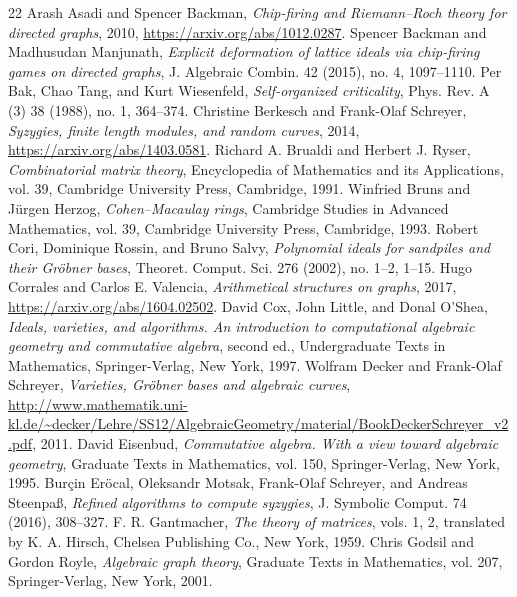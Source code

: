 \begin{thebibliography}{22}
 Arash Asadi and Spencer Backman, \emph{Chip-firing and Riemann--Roch theory for directed graphs}, 2010, \url{https://arxiv.org/abs/1012.0287}.
 Spencer Backman and Madhusudan Manjunath, \emph{Explicit deformation of lattice ideals via chip-firing games on directed graphs}, J. Algebraic Combin. 42 (2015), no. 4, 1097--1110.
 Per Bak, Chao Tang, and Kurt Wiesenfeld, \emph{Self-organized criticality}, Phys. Rev. A (3) 38 (1988), no. 1, 364--374.
 Christine Berkesch and Frank-Olaf Schreyer, \emph{Syzygies, finite length modules, and random curves}, 2014, \url{https://arxiv.org/abs/1403.0581}.
 Richard A. Brualdi and Herbert J. Ryser, \emph{Combinatorial matrix theory}, Encyclopedia of Mathematics and its Applications, vol. 39, Cambridge University Press, Cambridge, 1991.
 Winfried Bruns and J\"{u}rgen Herzog, \emph{Cohen--Macaulay rings}, Cambridge Studies in Advanced Mathematics, vol. 39, Cambridge University Press, Cambridge, 1993.
 Robert Cori, Dominique Rossin, and Bruno Salvy, \emph{Polynomial ideals for sandpiles and their Gr\"{o}bner bases}, Theoret. Comput. Sci. 276 (2002), no. 1--2, 1--15.
 Hugo Corrales and Carlos E. Valencia, \emph{Arithmetical structures on graphs}, 2017, \url{https://arxiv.org/abs/1604.02502}.
 David Cox, John Little, and Donal O'Shea, \emph{Ideals, varieties, and algorithms. An introduction to computational algebraic geometry and commutative algebra}, second ed., Undergraduate Texts in Mathematics, Springer-Verlag, New York, 1997.
 Wolfram Decker and Frank-Olaf Schreyer, \emph{Varieties, Gr\"{o}bner bases and algebraic curves}, \url{http://www.mathematik.uni-kl.de/~decker/Lehre/SS12/AlgebraicGeometry/material/BookDeckerSchreyer_v2.pdf}, 2011.
 David Eisenbud, \emph{Commutative algebra. With a view toward algebraic geometry}, Graduate Texts in Mathematics, vol. 150, Springer-Verlag, New York, 1995.
 Bur\c{c}in Er\"{o}cal, Oleksandr Motsak, Frank-Olaf Schreyer, and Andreas Steenpa\ss, \emph{Refined algorithms to compute syzygies}, J. Symbolic Comput. 74 (2016), 308--327.
 F. R. Gantmacher, \emph{The theory of matrices}, vols. 1, 2, translated by K. A. Hirsch, Chelsea Publishing Co., New York, 1959.
 Chris Godsil and Gordon Royle, \emph{Algebraic graph theory}, Graduate Texts in Mathematics, vol. 207, Springer-Verlag, New York, 2001.

\end{thebibliography}
